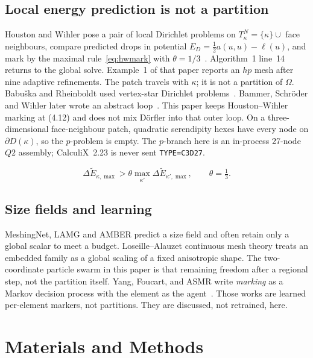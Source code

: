 \documentclass[applsci,article,submit,pdftex,oneauthor]{Definitions/mdpi}
\begin{document}
\subsection{Local energy prediction is not a partition}

Houston and Wihler pose a pair of local Dirichlet problems on $T_\kappa^N=\{\kappa\}\cup$ face neighbours, compare predicted drops in potential $E_D=\tfrac12 a(u,u)-\ell(u)$, and mark by the maximal rule~\eqref{eq:hwmark} with $\theta=1/3$~\citep{HoustonWihler2016}. Algorithm~1 line~14 returns to the global solve. Example~1 of that paper reports an $hp$ mesh after nine adaptive refinements. The patch travels with $\kappa$; it is not a partition of $\Omega$. Babu{\v{s}}ka and Rheinboldt used vertex-star Dirichlet problems~\citep{BabuskaRheinboldt1978}. Bammer, Schr{\"o}der and Wihler later wrote an abstract loop~\citep{Bammer2025}. This paper keeps Houston--Wihler marking at (4.12) and does not mix D{\"o}rfler into that outer loop. On a three-dimensional face-neighbour patch, quadratic serendipity hexes have every node on $\partial D(\kappa)$, so the $p$-problem is empty. The $p$-branch here is an in-process 27-node $Q2$ assembly; CalculiX~2.23 is never sent \texttt{TYPE=C3D27}.

\begin{equation}
\Delta\widetilde E_{\kappa,\max}>\theta\max_{\kappa'}\Delta\widetilde E_{\kappa',\max},\qquad\theta=\tfrac13.
\label{eq:hwmark}
\end{equation}

\subsection{Size fields and learning}

MeshingNet, LAMG and AMBER predict a size field and often retain only a global scalar to meet a budget. Loseille--Alauzet continuous mesh theory treats an embedded family as a global scaling of a fixed anisotropic shape. The two-coordinate particle swarm in this paper is that remaining freedom after a regional step, not the partition itself. Yang, Foucart, and ASMR write \emph{marking} as a Markov decision process with the element as the agent~\citep{Yang2023,Foucart2023}. Those works are learned per-element markers, not partitions. They are discussed, not retrained, here.

\section{Materials and Methods}
\label{sec:mm}
\end{document}
